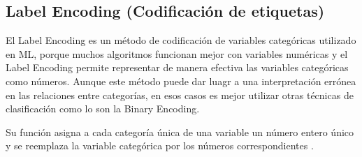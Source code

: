 \begin{table}[H]
\centering
\setlength{\tabcolsep}{5pt}
\caption{Binary Encoding con las variables que actualmente poseen dos estados activos}
\label{tab:Binary encoding}
\end{table}
        
    \hypertarget{label-encoding-codificaciuxf3n-de-etiquetas}{%
\subsection{Label Encoding (Codificación de etiquetas)}\label{label-encoding-codificaciuxf3n-de-etiquetas}}

El Label Encoding es un método de codificación de variables categóricas utilizado en ML, porque muchos algoritmos funcionan mejor con variables numéricas y el Label Encoding permite representar de manera efectiva las variables categóricas como números. Aunque este método puede dar luagr a una interpretación errónea en las relaciones entre categorías, en esos casos es mejor utilizar otras técnicas de clasificación como lo son la Binary Encoding.
\par Su función asigna a cada categoría única de una variable un número entero único y se reemplaza la variable categórica por los números correspondientes \cite{Hancock2020}.

